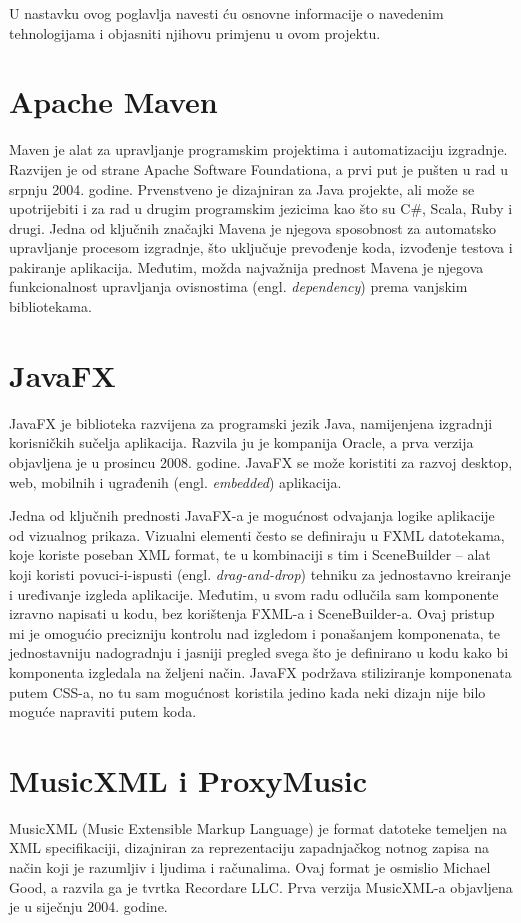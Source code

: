 \documentclass[diplomskirad, upload]{fer}
\begin{document}
U nastavku ovog poglavlja navesti ću osnovne informacije o navedenim tehnologijama i objasniti njihovu primjenu u ovom projektu.

\section{Apache Maven}
Maven \cite{maven} je alat za upravljanje programskim projektima i automatizaciju izgradnje. Razvijen je od strane Apache Software Foundationa, a prvi put je pušten u rad u srpnju 2004. godine. Prvenstveno je dizajniran za Java projekte, ali može se upotrijebiti i za rad u drugim programskim jezicima kao što su C\#, Scala, Ruby i drugi. Jedna od ključnih značajki Mavena je njegova sposobnost za automatsko upravljanje procesom izgradnje, što uključuje prevođenje koda, izvođenje testova i pakiranje aplikacija. Međutim, možda najvažnija prednost Mavena je njegova funkcionalnost upravljanja ovisnostima (engl. \textit{dependency}) prema vanjskim bibliotekama.

\section{JavaFX}
JavaFX \cite{javafx} je biblioteka razvijena za programski jezik Java, namijenjena izgradnji korisničkih sučelja aplikacija. Razvila ju je kompanija Oracle, a prva verzija objavljena je u prosincu 2008. godine. JavaFX se može koristiti za razvoj desktop, web, mobilnih i ugrađenih (engl. \textit{embedded}) aplikacija.

Jedna od ključnih prednosti JavaFX-a je mogućnost odvajanja logike aplikacije od vizualnog prikaza. Vizualni elementi često se definiraju u FXML datotekama, koje koriste poseban XML format, te u kombinaciji s tim i SceneBuilder – alat koji koristi povuci-i-ispusti (engl. \textit{drag-and-drop}) tehniku za jednostavno kreiranje i uređivanje izgleda aplikacije. Međutim, u svom radu odlučila sam komponente izravno napisati u kodu, bez korištenja FXML-a i SceneBuilder-a. Ovaj pristup mi je omogućio precizniju kontrolu nad izgledom i ponašanjem komponenata, te jednostavniju nadogradnju i jasniji pregled svega što je definirano u kodu kako bi komponenta izgledala na željeni način. JavaFX podržava stiliziranje komponenata putem CSS-a, no tu sam mogućnost koristila jedino kada neki dizajn nije bilo moguće napraviti putem koda.

\section{MusicXML i ProxyMusic}
\label{sec:musicxml}
MusicXML (Music Extensible Markup Language) \cite{musicxml} je format datoteke temeljen na XML specifikaciji, dizajniran za reprezentaciju zapadnjačkog notnog zapisa na način koji je razumljiv i ljudima i računalima. Ovaj format je osmislio Michael Good, a razvila ga je tvrtka Recordare LLC. Prva verzija MusicXML-a objavljena je u siječnju 2004. godine.
\end{document}
